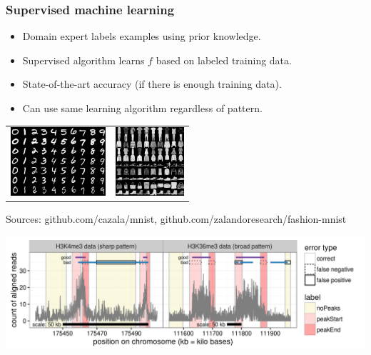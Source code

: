 \documentclass{beamer}
\begin{document}
\begin{frame}
  \frametitle{Supervised machine learning }

  \begin{itemize}
  \item Domain expert labels examples using prior knowledge.
  \item Supervised algorithm learns $f$ based on labeled training data.
  \item State-of-the-art accuracy (if there is enough training data).
  \item Can use same learning algorithm regardless of pattern.
  \end{itemize}

  \begin{center}
      \begin{tabular}{cc}
        \includegraphics[height=1in]{mnist-digits} &
  \includegraphics[height=1in]{fashion-mnist-sprite-some}  
  \end{tabular}
  \end{center}
  
  \vskip -0.2cm
  \scriptsize Sources: github.com/cazala/mnist, github.com/zalandoresearch/fashion-mnist

  \includegraphics[width=\textwidth]{figure-good-bad}
\end{frame}
\end{document}
